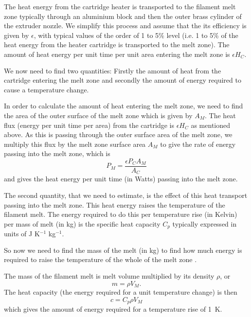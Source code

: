 The heat energy from the cartridge heater is transported to the filament melt zone typically through an aluminium block and then the outer brass cylinder of the extruder nozzle. We simplify this process and assume that the its efficiency is given by $\epsilon$, with typical values of the order of 1 to 5\% level (i.e. 1 to 5\% of the heat energy from the heater cartridge is transported to the melt zone). The amount of heat energy per unit time per unit area entering the melt zone is $\epsilon H_{C}$. 

We now need to find two quantities: Firstly the amount of heat from the cartridge entering the melt zone and secondly the amount of energy required to cause a temperature change. 

In order to calculate the amount of heat entering the melt zone, we need to find the area of the outer surface of the melt zone which is given by $A_{M}$. The heat flux (energy per unit time per area) from the cartridge is $\epsilon H_{C}$ as mentioned above. As this is passing through the outer surface area of the melt zone, we multiply this flux by the melt zone surface area $A_{M}$ to give the rate of energy passing into the melt zone, which is 
\begin{equation}
P_{M} = \frac{\epsilon P_{C} A_{M} }{A_{C}}
\label{H}
\end{equation}
and gives the heat energy per unit time (in Watts) passing into the melt zone. 

The second quantity, that we need to estimate, is the effect of this heat transport passing into the melt zone. This heat energy raises the temperature of the filament melt. The energy required to do this per temperature rise (in Kelvin) per mass of melt (in kg) is the specific heat capacity $C_{p}$ typically expressed in units of J K$^{-1}$ kg$^{-1}$. 

So now we need to find the mass of the melt (in kg) to find how much energy is required to raise the temperature of the whole of the melt zone . 

The mass of the filament melt is melt volume multiplied by its density $\rho$, or 
\begin{equation}
m = \rho V_{M}. 
\end{equation}
The heat capacity (the energy required for a unit temperature change) is then 
\begin{equation}
c = C_{p} \rho V_{M} 
\label{C}
\end{equation}
which gives the amount of energy required for a temperature rise of 1~K. 

